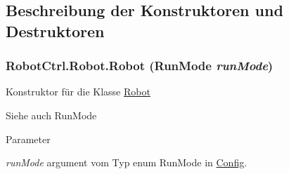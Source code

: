 \subsection{Beschreibung der Konstruktoren und Destruktoren}
\hypertarget{class_robot_ctrl_1_1_robot_acdd921df41328916b058eaad84ed3078}{
\subsubsection[{Robot}]{\setlength{\rightskip}{0pt plus 5cm}RobotCtrl.Robot.Robot (RunMode {\em runMode})}}
\label{class_robot_ctrl_1_1_robot_acdd921df41328916b058eaad84ed3078}
Konstruktor f\"{u}r die Klasse \hyperlink{class_robot_ctrl_1_1_robot}{Robot} \begin{DoxySeeAlso}{Siehe auch}
RunMode
\end{DoxySeeAlso}

\begin{DoxyParams}{Parameter}
\item[{\em runMode}]argument vom Typ enum RunMode in \hyperlink{class_robot_ctrl_1_1_config}{Config}. \end{DoxyParams}


